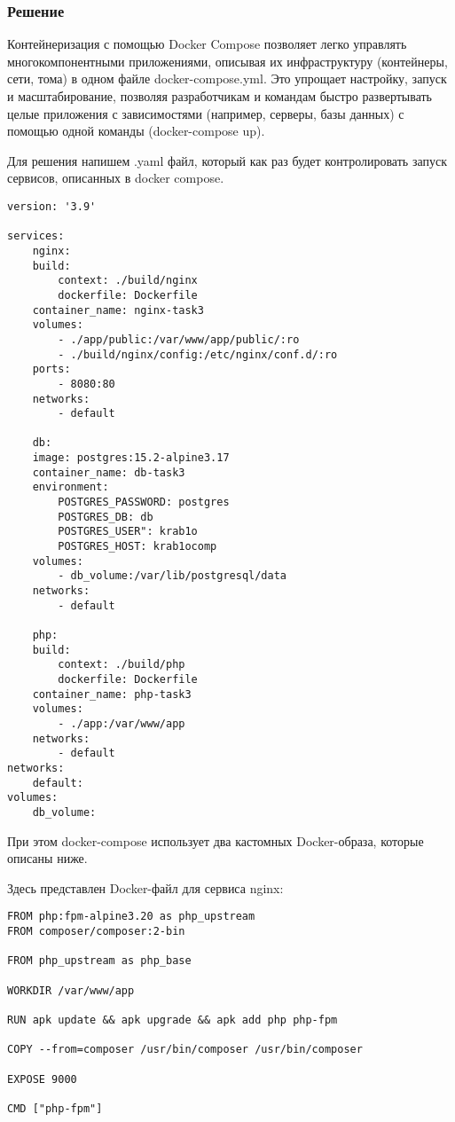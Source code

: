 \documentclass[pract]{SCWorks}
\begin{document}
\subsubsection{Решение}

Контейнеризация с помощью Docker Compose позволяет легко управлять 
многокомпонентными приложениями, описывая их инфраструктуру (контейнеры, 
сети, тома) в одном файле docker-compose.yml. Это упрощает настройку, 
запуск и масштабирование, позволяя разработчикам и командам быстро 
развертывать целые приложения с зависимостями (например, серверы, 
базы данных) с помощью одной команды (docker-compose up).

Для решения напишем .yaml файл, который как раз будет контролировать запуск 
сервисов, описанных в docker compose.

\begin{verbatim}
version: '3.9'

services:
    nginx:
    build:
        context: ./build/nginx
        dockerfile: Dockerfile
    container_name: nginx-task3
    volumes:
        - ./app/public:/var/www/app/public/:ro
        - ./build/nginx/config:/etc/nginx/conf.d/:ro
    ports: 
        - 8080:80
    networks:
        - default
    
    db:
    image: postgres:15.2-alpine3.17
    container_name: db-task3
    environment:
        POSTGRES_PASSWORD: postgres
        POSTGRES_DB: db
        POSTGRES_USER": krab1o
        POSTGRES_HOST: krab1ocomp
    volumes:
        - db_volume:/var/lib/postgresql/data
    networks:
        - default

    php:
    build:
        context: ./build/php
        dockerfile: Dockerfile
    container_name: php-task3
    volumes:
        - ./app:/var/www/app
    networks:
        - default
networks:
    default:
volumes:
    db_volume:
\end{verbatim}

При этом docker-compose использует два кастомных Docker-образа, которые 
описаны ниже.

Здесь представлен Docker-файл для сервиса nginx:

\begin{verbatim}
FROM php:fpm-alpine3.20 as php_upstream
FROM composer/composer:2-bin

FROM php_upstream as php_base

WORKDIR /var/www/app

RUN apk update && apk upgrade && apk add php php-fpm

COPY --from=composer /usr/bin/composer /usr/bin/composer

EXPOSE 9000

CMD ["php-fpm"]
\end{verbatim}
\end{document}
